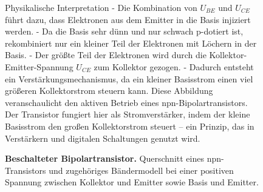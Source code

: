 {\begin{figure}[H]
{            Physikalische Interpretation
            - Die Kombination von \( U_{BE} \) und \( U_{CE} \) führt dazu, dass Elektronen aus dem Emitter in die Basis injiziert werden.
            - Da die Basis sehr dünn und nur schwach p-dotiert ist, rekombiniert nur ein kleiner Teil der Elektronen mit Löchern in der Basis.
            - Der größte Teil der Elektronen wird durch die Kollektor-Emitter-Spannung \( U_{CE} \) zum Kollektor gezogen.
            - Dadurch entsteht ein Verstärkungsmechanismus, da ein kleiner Basisstrom einen viel größeren Kollektorstrom steuern kann.
            Diese Abbildung veranschaulicht den aktiven Betrieb eines npn-Bipolartransistors. Der Transistor fungiert hier als Stromverstärker, indem der kleine Basisstrom den großen Kollektorstrom steuert – ein Prinzip, das in Verstärkern und digitalen Schaltungen genutzt wird.}
        \caption{\textbf{Beschalteter Bipolartransistor.} Querschnitt eines npn-Transistors und zugehöriges Bändermodell bei einer positiven Spannung zwischen Kollektor und Emitter sowie Basis und Emitter.}
        \label{fig:BeschalteterBipolartransistor}
    \end{figure}
}


